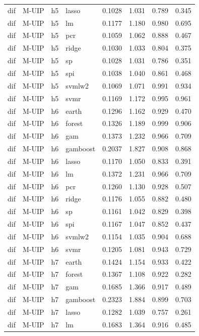 \begin{ThreePartTable}
\begin{longtable}[t]{llclcccc}
dif & M-UIP & h5 & lasso & 0.1028 & 1.031 & 0.789 & 0.345\\
dif & M-UIP & h5 & lm & 0.1177 & 1.180 & 0.980 & 0.695\\
dif & M-UIP & h5 & pcr & 0.1059 & 1.062 & 0.888 & 0.467\\
dif & M-UIP & h5 & ridge & 0.1030 & 1.033 & 0.804 & 0.375\\
dif & M-UIP & h5 & sp & 0.1028 & 1.031 & 0.786 & 0.351\\
dif & M-UIP & h5 & spi & 0.1038 & 1.040 & 0.861 & 0.468\\
dif & M-UIP & h5 & svmlw2 & 0.1069 & 1.071 & 0.991 & 0.934\\
dif & M-UIP & h5 & svmr & 0.1169 & 1.172 & 0.995 & 0.961\\
\addlinespace
dif & M-UIP & h6 & earth & 0.1296 & 1.162 & 0.929 & 0.470\\
dif & M-UIP & h6 & forest & 0.1326 & 1.189 & 0.999 & 0.906\\
dif & M-UIP & h6 & gam & 0.1373 & 1.232 & 0.966 & 0.709\\
dif & M-UIP & h6 & gamboost & 0.2037 & 1.827 & 0.908 & 0.868\\
dif & M-UIP & h6 & lasso & 0.1170 & 1.050 & 0.833 & 0.391\\
dif & M-UIP & h6 & lm & 0.1372 & 1.231 & 0.966 & 0.709\\
dif & M-UIP & h6 & pcr & 0.1260 & 1.130 & 0.928 & 0.507\\
dif & M-UIP & h6 & ridge & 0.1176 & 1.055 & 0.882 & 0.480\\
dif & M-UIP & h6 & sp & 0.1161 & 1.042 & 0.829 & 0.398\\
dif & M-UIP & h6 & spi & 0.1167 & 1.047 & 0.852 & 0.437\\
dif & M-UIP & h6 & svmlw2 & 0.1154 & 1.035 & 0.904 & 0.688\\
dif & M-UIP & h6 & svmr & 0.1205 & 1.081 & 0.943 & 0.729\\
\addlinespace
dif & M-UIP & h7 & earth & 0.1424 & 1.154 & 0.933 & 0.422\\
dif & M-UIP & h7 & forest & 0.1367 & 1.108 & 0.922 & 0.282\\
dif & M-UIP & h7 & gam & 0.1685 & 1.366 & 0.917 & 0.489\\
dif & M-UIP & h7 & gamboost & 0.2323 & 1.884 & 0.899 & 0.703\\
dif & M-UIP & h7 & lasso & 0.1282 & 1.039 & 0.757 & 0.261\\
dif & M-UIP & h7 & lm & 0.1683 & 1.364 & 0.916 & 0.485\\

\end{longtable}
\end{ThreePartTable}
